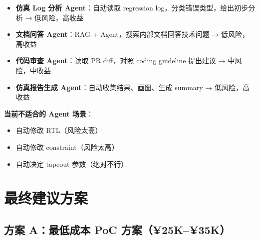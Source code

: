 \documentclass[UTF8,a4paper,10pt,oneside]{ctexart}
\begin{document}
\begin{itemize}
    \item \textbf{仿真 Log 分析 Agent}：自动读取 regression log，分类错误类型，给出初步分析 → 低风险，高收益
    \item \textbf{文档问答 Agent}：RAG + Agent，搜索内部文档回答技术问题 → 低风险，高收益
    \item \textbf{代码审查 Agent}：读取 PR diff，对照 coding guideline 提出建议 → 中风险，中收益
    \item \textbf{仿真报告生成 Agent}：自动收集结果、画图、生成 summary → 低风险，高收益
\end{itemize}

\textbf{当前不适合的 Agent 场景}：
\begin{itemize}
    \item 自动修改 RTL（风险太高）
    \item 自动修改 constraint（风险太高）
    \item 自动决定 tapeout 参数（绝对不行）
\end{itemize}


\section{最终建议方案}

\subsection{方案 A：最低成本 PoC 方案（¥25K--¥35K）}
\end{document}
